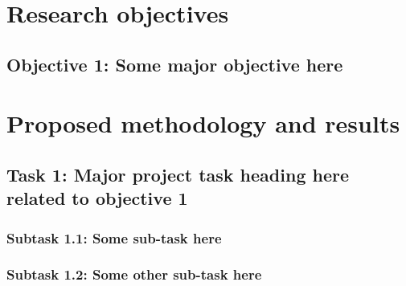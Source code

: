 \section{Research objectives}                   %

\blindtext

\subsection*{Objective 1: Some major objective here}

\blindtext







\section{Proposed methodology and results}      %

\blindtext

\subsection{Task 1: Major project task heading here related to objective 1}

\blindtext


\subsubsection*{Subtask 1.1: Some sub-task here}

\blindtext




\subsubsection*{Subtask 1.2: Some other sub-task here}

